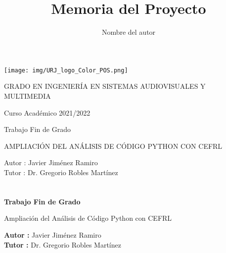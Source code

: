 \documentclass[a4paper, 12pt]{book}
\title{Memoria del Proyecto}
\author{Nombre del autor}
\begin{document}
\renewcommand{\refname}{Bibliografía}  %
\renewcommand{\appendixname}{Apéndice}


\begin{titlepage}
\begin{center}
\texttt{[image: img/URJ\_logo\_Color\_POS.png]}

\vspace{1.75cm}

\Large
GRADO EN INGENIERÍA EN SISTEMAS AUDIOVISUALES Y MULTIMEDIA

\vspace{0.4cm}

\large
Curso Académico 2021/2022

\vspace{0.8cm}

Trabajo Fin de Grado

\vspace{2.5cm}

\LARGE
AMPLIACIÓN DEL ANÁLISIS DE CÓDIGO PYTHON CON CEFRL 

\vspace{4cm}

\large
Autor : Javier Jiménez Ramiro \\
Tutor : Dr. Gregorio Robles Martínez
\end{center}
\end{titlepage}

\newpage
\mbox{}
\thispagestyle{empty} %


\clearpage
{}
\chapter*{}

\vspace{-4cm}
\begin{center}
\LARGE
\textbf{Trabajo Fin de Grado}

\vspace{1cm}
\large
Ampliación del Análisis de Código Python con CEFRL

\vspace{1cm}
\large
\textbf{Autor :} Javier Jiménez Ramiro \\
\textbf{Tutor :} Dr. Gregorio Robles Martínez

\end{center}
\end{document}
